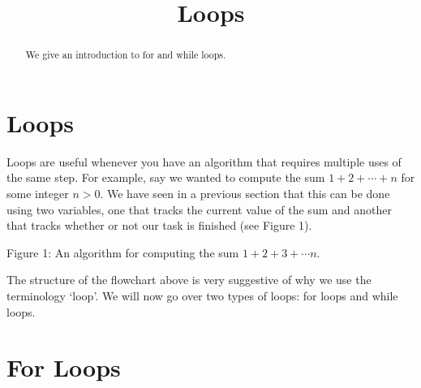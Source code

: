 \documentclass{ximera}
\title{Loops}
\begin{document}
\begin{abstract}
We give an introduction to for and while loops.
\end{abstract}
\maketitle

\section{Loops}

Loops are useful whenever you have an algorithm that requires multiple uses of the same step. For example, say we wanted to compute the sum $1+2+\cdots+n$ for some integer $n>0$. We have seen in a previous section that this can be done using two variables, one that tracks the current value of the sum and another that tracks whether or not our task is finished (see Figure 1).

\begin{center}
\end{center}
\begin{center}
	Figure 1: An algorithm for computing the sum $1+2+3+\cdots n$.
\end{center}

The structure of the flowchart above is very suggestive of why we use the terminology `loop'. We will now go over two types of loops: for loops and while loops.

\section{For Loops}
\end{document}
